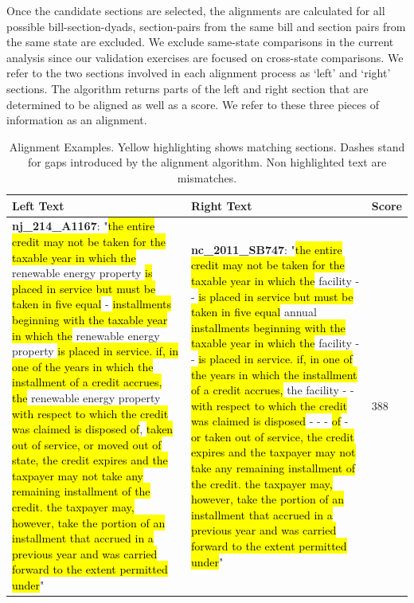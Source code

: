 \documentclass[12pt]{article} %
\begin{document}
Once the candidate sections are selected, the alignments are calculated for all possible bill-section-dyads, section-pairs from the same bill and section pairs from the same state are excluded. We exclude same-state comparisons in the current analysis since our validation exercises are focused on cross-state comparisons. We refer to the two sections involved in each alignment process as `left' and `right' sections. The algorithm returns parts of the left and right section that are determined to be aligned as well as a score. We refer to these three pieces of information as an alignment. 

\clearpage

\begin{table}[ht!]
\centering
\caption{Alignment Examples. Yellow highlighting shows matching sections. Dashes stand for gaps introduced by the alignment algorithm. Non highlighted text are mismatches.}
\label{tab:alignment_examples}
\bgroup
\def\arraystretch{2}
\begin{tabular}{p{}|p{}|p{}}
Left Text & Right Text & Score\\
\hline

\textbf{nj\_214\_A1167}: "\hl{the entire credit may not be taken for the taxable year in which the} renewable energy property \hl{is placed in service but must be taken in five equal} - \hl{installments beginning with the taxable year in which the} renewable energy property \hl{is placed in service. if, in one of the years in which the installment of a credit accrues, the} renewable energy property \hl{with respect to which the credit was claimed is disposed of}, \hl{taken out of service, or moved out of state, the credit expires and the taxpayer may not take any remaining installment of the credit. the taxpayer may, however, take the portion of an installment that accrued in a previous year and was carried forward to the extent permitted under}" & \textbf{nc\_2011\_SB747}: "\hl{the entire credit may not be taken for the taxable year in which the} facility - - \hl{is placed in service but must be taken in five equal} annual \hl{installments beginning with the taxable year in which the} facility - - \hl{is placed in service. if, in one of the years in which the installment of a credit accrues,} the facility - - \hl{with respect to which the credit was claimed is disposed} - - - \hl{of} - \hl{or taken out of service, the credit expires and the taxpayer may not take any remaining installment of the credit. the taxpayer may, however, take the portion of an installment that accrued in a previous year and was carried forward to the extent permitted under}" & $388$ \\


\end{tabular}
\end{table}
\end{document}

